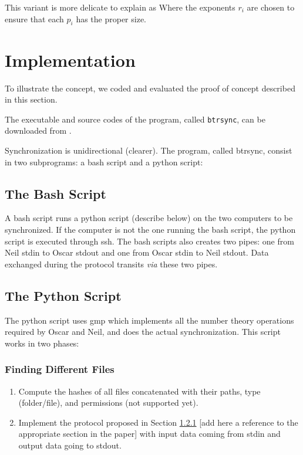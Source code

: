 \documentclass[11pt]{llncs}
\newcommand{\btrsync}{\texttt{btrsync}\xspace}
\begin{document}
This variant is more delicate to explain as Where the exponents $r_i$ are chosen to ensure that each $p_i$ has the proper size.

\section{Implementation}
\label{program}

To illustrate the concept, we coded and evaluated the proof of concept described in this section.\smallskip

The executable and source codes of the program, called \btrsync, can be downloaded from \cite{Robin}.\smallskip

Synchronization is unidirectional (clearer). The program, called {\sf btrsync}, consist in two subprograms: a bash script and a python script:

\subsection{The Bash Script}

A bash script runs a python script (describe below) on the two computers to be synchronized. If the computer is not the one running the bash script, the python script is executed through ssh. The bash scripts also creates two pipes: one from Neil stdin to Oscar stdout and one from Oscar stdin to Neil stdout. Data exchanged during the protocol transits {\sl via} these two pipes.

\subsection{The Python Script}

The python script uses gmp which implements all the number theory operations required by Oscar and Neil, and does the actual synchronization. This script works in two phases:

\subsubsection{Finding Different Files}

\begin{enumerate}
\item Compute the hashes of all files concatenated with their paths, type (folder/file), and permissions (not supported yet).
\item Implement the protocol proposed in Section \ref{} [add here a reference to the appropriate section in the paper] with input data coming from stdin and output data going to stdout.
\end{enumerate}
\end{document}
